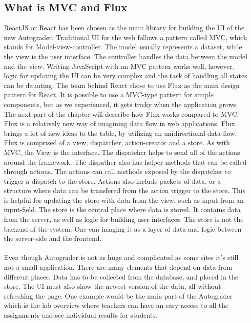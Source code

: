 \subsection{What is MVC and Flux}
ReactJS or React has been chosen as the main library for building the UI of the new Autograder. Traditional UI for the web follows a pattern called MVC, which stands for Model-view-controller. The model usually represents a dataset, while the view is the user interface. The controller handles the data between the model and the view. Writing JavaScript with an MVC pattern works well, however, logic for updating the UI can be very complex and the task of handling all states can be daunting. The team behind React chose to use Flux as the main design pattern for React. It is possible to use a MVC-type pattern for simple components, but as we experienced, it gets tricky when the application grows. The next part of the chapter will describe how Flux works compared to MVC.
\\
Flux is a relatively new way of imagining data flow in web applications. Flux brings a lot of new ideas to the table, by utilizing an unidirectional data-flow. Flux is comprised of a view, dispatcher, action-creator and a store. As with MVC, the View is the interface. The dispatcher helps to send all of the actions around the framework. The dispather also has helper-methods that can be called through actions. The actions can call methods exposed by the dispatcher to trigger a dispatch to the store. Actions also include packets of data, or a structure where data can be transfered from the action trigger to the store. This is helpful for updating the store with data from the view, such as input from an input-field. The store is the central place where data is stored. It contains data from the server, as well as logic for building user interfaces. The store is not the backend of the system. One can imaging it as a layer of data and logic between the server-side and the frontend.
\\
\\
Even though Autograder is not as huge and complicated as some sites it's still not a small application. There are many elements that depend on data from different places. Data has to be collected from the database, and placed in the store. The UI must also show the newest version of the data, all without refreshing the page. One example would be the main part of the Autograder which is the lab overview where teachers can have an easy access to all the assignments and see individual results for students.
